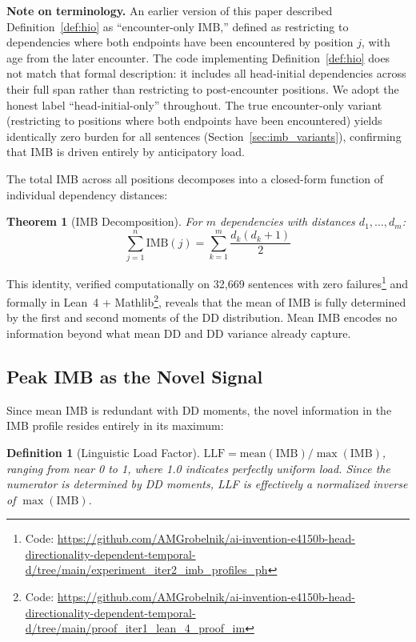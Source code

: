 \documentclass[11pt,letterpaper]{article}
\newtheorem{theorem}{Theorem}
\newtheorem{definition}{Definition}
\begin{document}
\noindent\textbf{Note on terminology.} An earlier version of this paper described Definition~\ref{def:hio} as ``encounter-only IMB,'' defined as restricting to dependencies where both endpoints have been encountered by position $j$, with age from the later encounter. The code implementing Definition~\ref{def:hio} does not match that formal description: it includes all head-initial dependencies across their full span rather than restricting to post-encounter positions. We adopt the honest label ``head-initial-only'' throughout. The true encounter-only variant (restricting to positions where both endpoints have been encountered) yields identically zero burden for all sentences (Section~\ref{sec:imb_variants}), confirming that IMB is driven entirely by anticipatory load.

The total IMB across all positions decomposes into a closed-form function of individual dependency distances:

\begin{theorem}[IMB Decomposition]
\label{thm:decomposition}
For $m$ dependencies with distances $d_1, \ldots, d_m$:
\begin{equation}
\sum_{j=1}^{n} \text{IMB}(j) = \sum_{k=1}^{m} \frac{d_k(d_k + 1)}{2}
\end{equation}
\end{theorem}

This identity, verified computationally on 32,669 sentences with zero failures\footnote{Code: \url{https://github.com/AMGrobelnik/ai-invention-e4150b-head-directionality-dependent-temporal-d/tree/main/experiment_iter2_imb_profiles_ph}} and formally in Lean~4 + Mathlib\footnote{Code: \url{https://github.com/AMGrobelnik/ai-invention-e4150b-head-directionality-dependent-temporal-d/tree/main/proof_iter1_lean_4_proof_im}}, reveals that the mean of IMB is fully determined by the first and second moments of the DD distribution. Mean IMB encodes no information beyond what mean DD and DD variance already capture.


\subsection{Peak IMB as the Novel Signal}

Since mean IMB is redundant with DD moments, the novel information in the IMB profile resides entirely in its maximum:

\begin{definition}[Linguistic Load Factor]
\label{def:llf}
$\text{LLF} = \text{mean}(\text{IMB}) / \max(\text{IMB})$, ranging from near 0 to 1, where 1.0 indicates perfectly uniform load. Since the numerator is determined by DD moments, LLF is effectively a normalized inverse of $\max(\text{IMB})$.
\end{definition}
\end{document}

